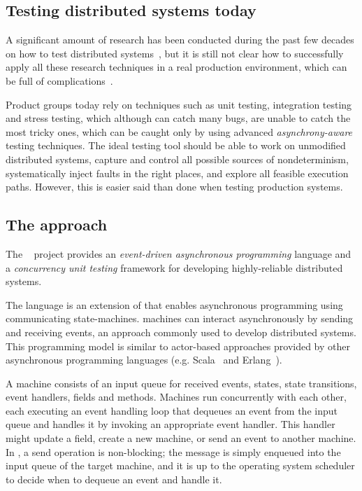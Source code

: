 \subsection{Testing distributed systems today}
\label{sec:overview:testing}

A significant amount of research has been conducted during the past few decades on how to test distributed systems~\cite{lamport1977proving, lamport1994temporal, schuppan2004efficient, killian2007life, gupta2008diecast, yang2009modist}, but it is still not clear how to successfully apply all these research techniques in a real production environment, which can be full of complications~\cite{cavage2013there, maddox2015test}.

Product groups today rely on techniques such as unit testing, integration testing and stress testing, which although can catch many bugs, are unable to catch the most tricky ones, which can be caught only by using advanced \emph{asynchrony-aware} testing techniques. The ideal testing tool should be able to work on unmodified distributed systems, capture and control all possible sources of nondeterminism, systematically inject faults in the right places, and explore all feasible execution paths. However, this is easier said than done when testing production systems.


\subsection{The \psharp approach}
\label{sec:overview:psharp}


The \psharp~\cite{deligiannis2015psharp} project provides an \emph{event-driven asynchronous programming} language and a \emph{concurrency unit testing} framework for developing highly-reliable distributed systems.

The \psharp language is an extension of \csharp that enables asynchronous programming using communicating state-machines. \psharp machines can interact asynchronously by sending and receiving events, an approach commonly used to develop distributed systems. This programming model is similar to actor-based approaches provided by other asynchronous programming languages (e.g. Scala~\cite{odersky2008programming} and Erlang~\cite{armstrong1996erlang}).

A \psharp machine consists of an input queue for received events, states, state transitions, event handlers, fields and methods. Machines run concurrently with each other, each executing an event handling loop that dequeues an event from the input queue and handles it by invoking an appropriate event handler. This handler might update a field, create a new machine, or send an event to another machine. In \psharp, a send operation is non-blocking; the message is simply enqueued into the input queue of the target machine, and it is up to the operating system scheduler to decide when to dequeue an event and handle it.

